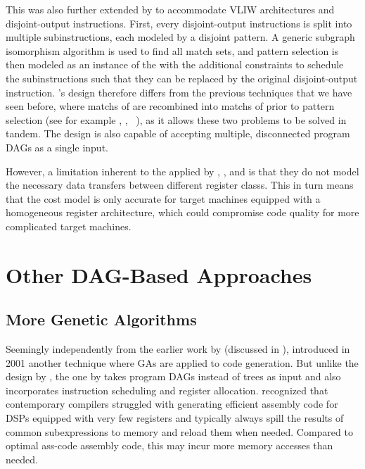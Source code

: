 This \tCPmodel was also further extended by  to accommodate \gls{VLIW} architectures and \glspl{disjoint-output
  instruction}.
%
First, every \glspl{disjoint-output instruction} is split into
multiple \glspl{subinstruction}, each modeled by a disjoint \gls{pattern}.
%
A
generic \gls{subgraph isomorphism} algorithm is used to find all
\glspl{match set}, and \gls{pattern selection} is then modeled as an instance of
the \tCPmodel with the additional constraints to schedule the
\glspl{subinstruction} such that they can be replaced by the original
\gls{disjoint-output instruction}.
%
\citeauthor{Arslan2013}'s design therefore
differs from the previous techniques that we have seen before, where
\glspl{match} of \tpartialPatterns are recombined into \glspl{match} of
\tcomplexPatterns prior to \gls{pattern selection} (see for example
\textcite{Scharwaechter2007}, \textcite{Ahn2009},
\citeauthor{Arnold1999b}~\cite{Arnold1999a, Arnold1999b, Arnold2001}), as it
allows these two problems to be solved in tandem.
%
The design is also capable of
accepting multiple, disconnected \glspl{program DAG} as a single input.

However, a limitation inherent to the \tCPmodels applied by
\citeauthor{Martin2009}, \citeauthor{Floch2010}, and \citeauthor{Arslan2013} is
that they do not model the necessary data transfers between different
\glspl{register class}.
%
This in turn means that the cost model is only accurate
for \glspl{target machine} equipped with a homogeneous \gls{register}
architecture, which could compromise code quality for more complicated
\glspl{target machine}.


\section{Other DAG-Based Approaches}

\subsection{More Genetic Algorithms}

Seemingly independently from the earlier work by \textcite{Shu1996} (discussed
in ), 
introduced in 2001 another technique where \glsdesc{GA}s are applied to
\gls{code generation}.
%
But unlike the design by \citeauthor{Shu1996}, the one by
\citeauthor{Lorenz2001} takes \glspl{program DAG} instead of \glspl{tree} as
input and also incorporates \gls{instruction scheduling} and \gls{register
  allocation}.
%
\citeauthor{Lorenz2001} recognized that contemporary
\glspl{compiler} struggled with generating efficient \gls{assembly code} for
\glspl{DSP} equipped with very few \glspl{register} and typically always spill
the results of common subexpressions to memory and reload them when needed.
Compared to \gls{optimal ass-code} \gls{assembly code}, this may incur more
memory accesses than needed.

